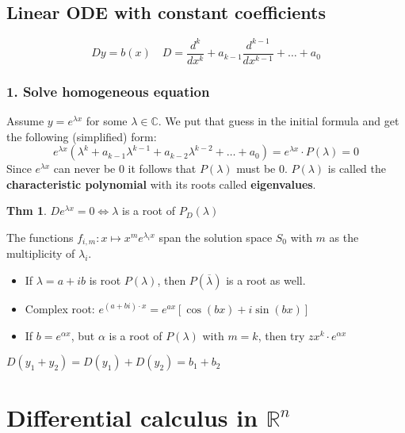 \documentclass[a4paper, 10pt]{article}
\theoremstyle{definition}
\newtheorem*{theorem}{Thm}
\newcommand{\R}{\mathbb{R}}
\newcommand{\C}{\mathbb{C}}
\begin{document}
\subsection{Linear ODE with constant coefficients}
\[Dy = b(x) \quad D = \frac{d^k}{dx^k} + a_{k - 1} \frac{d^{k-1}}{dx^{k-1}} + \ldots + a_0\]

\subsubsection*{1. Solve homogeneous equation}
Assume \(y = e^{\lambda x}\) for some \(\lambda \in \C\). We put that guess in the initial formula and get the following (simplified) form:
\[e^{\lambda x}(\lambda^k + a_{k-1}\lambda^{k-1} + a_{k-2}\lambda^{k-2} + \ldots + a_0) = e^{\lambda x} \cdot P(\lambda) = 0\]
Since \(e^{\lambda x}\) can never be \(0\) it follows that \(P(\lambda)\) must be \(0\). \(P(\lambda)\) is called the \textbf{characteristic polynomial} with its roots called \textbf{eigenvalues}.

\begin{theorem}
    \(D e^{\lambda x} = 0 \iff \lambda\) is a root of \(P_D(\lambda)\)
\end{theorem}

\begin{note*}[Solutions]
    The functions \(f_{i, m}: x \mapsto x^m e^{\lambda_i x}\) span the solution space \(S_0\) with \(m\) as the multiplicity of \(\lambda_i\).

    \begin{itemize}
        \item If \(\lambda = a + ib\) is root \(P(\lambda)\), then \(P(\overline{\lambda})\) is a root as well.
        \item Complex root: \(e^{(a + bi) \cdot x} = e^{ax}[\cos(bx) + i \sin(bx)]\)
        \item If \(b = e^{\alpha x}\), but \(\alpha\) is a root of \(P(\lambda)\) with \(m = k\), then try \(zx^k \cdot e^{\alpha x}\)
    \end{itemize}
\end{note*}

\begin{ntheorem*}
    \(D(y_1 + y_2) = D(y_1) + D(y_2) = b_1 + b_2\)
\end{ntheorem*}

\pagebreak
\section{Differential calculus in \(\R^n\)}
\end{document}
